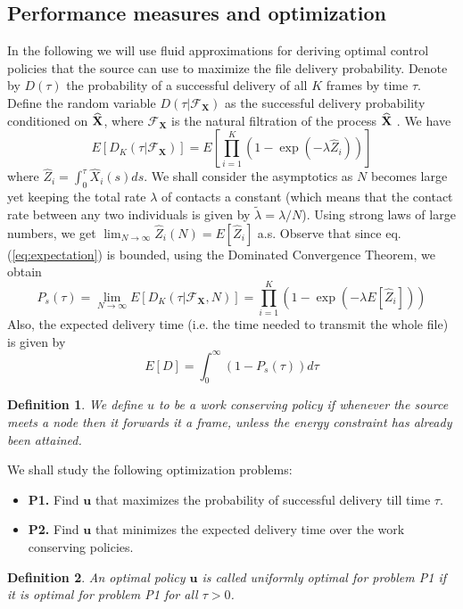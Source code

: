 \documentclass[10pt,twocolumn,conference,final]{IEEEtran}
\newtheorem{definition}{Definition}[section]
\newcommand{\eF}{\mathcal F_{\mathbf X}}
\newcommand{\ubf}{\mathbf u}
\begin{document}
\subsection{\bf Performance measures and optimization}\label{subsec:perf}
In the following we will use fluid approximations for deriving
optimal control policies that the source can use to maximize the file delivery
probability. Denote by $D(\tau)$ the probability of a successful delivery of all $K$ frames
by time $\tau$. Define the random variable $D(\tau | \eF )$ as the successful delivery
probability conditioned on $\widehat {\bf X }$, where $\eF$
is the natural filtration of the process  $\widehat {\bf X }$ \cite{breiman}. We have
\begin{equation}\label{eq:expectation}
E[ D_K (\tau |\eF) ]= E \left[ \prod_{i=1}^K ( 1 - \exp (- \lambda  \widehat Z_i )) \right]
\end{equation}
where $\widehat Z_i = \int_0^\tau \widehat X_i(s) ds$.
We shall consider the asymptotics as $N$ becomes large yet
keeping the total rate $\lambda$ of contacts a constant (which means
that the contact rate between any two individuals is
given by $\widetilde \lambda = \lambda /N$).
Using strong laws of large numbers, we get $\lim_{N \to \infty}
\widehat Z_i (N) =  E[\widehat Z_i]$ a.s. Observe that since eq. (\ref{eq:expectation}) is
bounded, using the Dominated Convergence Theorem,
we obtain
\[
P_s ( \tau )=\lim_{N \to \infty} E[D_K(\tau|\eF,N) ]
= \prod_{i=1}^K ( 1 - \exp (- \lambda   E[ \widehat Z_i ] ))
\]
Also, the expected delivery time (i.e. the time
needed to transmit the whole file) is given by
\[
E[D] = \int_0^\infty ( 1 - P_s ( \tau )) d \tau
\]
\begin{definition}
We define $u$ to be a {\em work conserving} policy if whenever the source
meets a node then it forwards it a frame, unless the energy constraint has
already been attained. \end{definition}
We shall study the following optimization problems:
\begin{itemize}
\item
{\bf P1.} Find $\ubf$ that maximizes the probability of
successful delivery till time $\tau$.
\item
{\bf P2.}
Find $\ubf$ that minimizes the expected delivery time
over the work conserving policies.
\end{itemize}
\begin{definition}
An optimal policy $\ubf$ is called {\em uniformly optimal} for problem P1
 if it is optimal for problem P1 for all $\tau>0$.
\end{definition}
\end{document}
